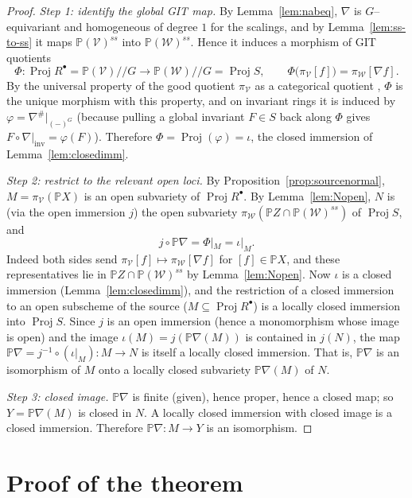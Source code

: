 \documentclass{amsart}
\theoremstyle{definition}
\DeclareMathOperator{\Proj}{Proj}
\newcommand{\PP}{\mathbb{P}}
\newcommand{\nab}{\nabla}
\begin{document}
\begin{proof}
\emph{Step 1: identify the global GIT map.} By Lemma~\ref{lem:nabeq}, $\nab$ is
$G$--equivariant and homogeneous of degree $1$ for the scalings, and by Lemma~\ref{lem:ss-to-ss}
it maps $\PP(\mathcal V)^{ss}$ into $\PP(\mathcal W)^{ss}$. Hence it induces a morphism of GIT
quotients
\[
\Phi\colon \Proj R^{\bullet}=\PP(\mathcal V)/\!/G\longrightarrow
\PP(\mathcal W)/\!/G=\Proj S,\qquad \Phi\big(\pi_{\mathcal V}[f]\big)=\pi_{\mathcal W}[\nab f].
\]
By the universal property of the good quotient $\pi_{\mathcal V}$ as a categorical quotient
\cite[Ch.~1, \S 2, Thm.~1.10]{MFK}, $\Phi$ is the unique morphism with this property, and on
invariant rings it is induced by $\varphi=\nab^{\#}|_{(-)^G}$ (because pulling a global
invariant $F\in S$ back along $\Phi$ gives $F\circ\nab|_{\text{inv}}=\varphi(F)$). Therefore
$\Phi=\Proj(\varphi)=\iota$, the closed immersion of Lemma~\ref{lem:closedimm}.

\emph{Step 2: restrict to the relevant open loci.} By Proposition~\ref{prop:sourcenormal},
$M=\pi_{\mathcal V}(\PP X)$ is an open subvariety of $\Proj R^{\bullet}$. By
Lemma~\ref{lem:Nopen}, $N$ is (via the open immersion $j$) the open subvariety
$\pi_{\mathcal W}(\PP Z\cap\PP(\mathcal W)^{ss})$ of $\Proj S$, and
\[
j\circ\PP\nab=\Phi|_{M}=\iota|_{M}.
\]
Indeed both sides send $\pi_{\mathcal V}[f]\mapsto\pi_{\mathcal W}[\nab f]$ for
$[f]\in\PP X$, and these representatives lie in $\PP Z\cap\PP(\mathcal W)^{ss}$ by
Lemma~\ref{lem:Nopen}. Now $\iota$ is a closed immersion (Lemma~\ref{lem:closedimm}), and the
restriction of a closed immersion to an open subscheme of the source ($M\subseteq\Proj
R^{\bullet}$) is a locally closed immersion into $\Proj S$. Since $j$ is an open immersion
(hence a monomorphism whose image is open) and the image $\iota(M)=j(\PP\nab(M))$ is contained
in $j(N)$, the map $\PP\nab=j^{-1}\circ(\iota|_M)\colon M\to N$ is itself a locally closed
immersion. That is, $\PP\nab$ is an isomorphism of $M$ onto a locally closed subvariety
$\PP\nab(M)$ of $N$.

\emph{Step 3: closed image.} $\PP\nab$ is finite (given), hence proper, hence a closed map;
so $Y=\PP\nab(M)$ is closed in $N$. A locally closed immersion with closed image is a closed
immersion. Therefore $\PP\nab\colon M\to Y$ is an isomorphism.
\end{proof}

\section{Proof of the theorem}\label{sec:conclude}
\end{document}
